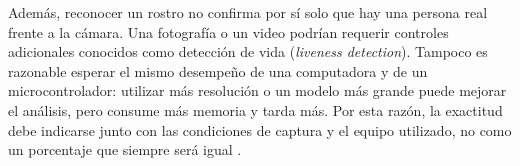 Además, reconocer un rostro no confirma por sí solo que hay una persona real
frente a la cámara. Una fotografía o un video podrían requerir controles
adicionales conocidos como detección de vida (\textit{liveness detection}).
Tampoco es razonable esperar el mismo desempeño de una computadora y de un
microcontrolador: utilizar más resolución o un modelo más grande puede mejorar
el análisis, pero consume más memoria y tarda más. Por esta razón, la exactitud
debe indicarse junto con las condiciones de captura y el equipo utilizado, no
como un porcentaje que siempre será igual \cite{ESPDLPerformance}.
